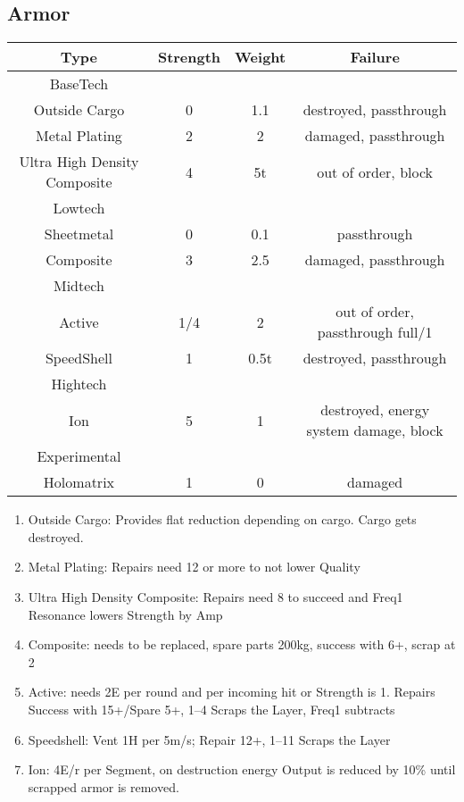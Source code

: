 \subsection{Armor}\label{subsec:armor}
\begin{tabular}{c|ccc}
    Type & Strength & Weight & Failure\\
    \hline BaseTech&&&\\
    Outside Cargo & 0 & 1.1 & destroyed, passthrough\\
    Metal Plating & 2 & 2 & damaged, passthrough\\
    Ultra High Density Composite & 4 & 5t & out of order, block\\
    \hline Lowtech &&&\\
    Sheetmetal & 0 & 0.1 & passthrough \\
    Composite & 3 & 2.5 & damaged, passthrough \\
    \hline Midtech &&&\\
    Active & 1/4 & 2 & out of order, passthrough full/1\\
    SpeedShell & 1 & 0.5t & destroyed, passthrough \\
    \hline Hightech &&&\\
    Ion & 5 & 1 & destroyed, energy system damage, block \\
    \hline Experimental &&&\\
    Holomatrix & 1 & 0 & damaged
\end{tabular}

\begin{enumerate}[label = - ]
    \item Outside Cargo: Provides flat reduction depending on cargo.
    Cargo gets destroyed.
    \item Metal Plating: Repairs need 12 or more to not lower Quality
    \item Ultra High Density Composite: Repairs need 8 to succeed and Freq1 Resonance lowers Strength by Amp
    \item Composite: needs to be replaced, spare parts 200kg, success with 6+, scrap at 2
    \item Active: needs 2E per round and per incoming hit or Strength is 1.
    Repairs Success with 15+/Spare 5+, 1--4 Scraps the Layer, Freq1 subtracts
    \item Speedshell: Vent 1H per 5m/s;
    Repair 12+, 1--11 Scraps the Layer
    \item Ion: 4E/r per Segment, on destruction energy Output is reduced by 10\% until scrapped armor is removed.
\end{enumerate}

